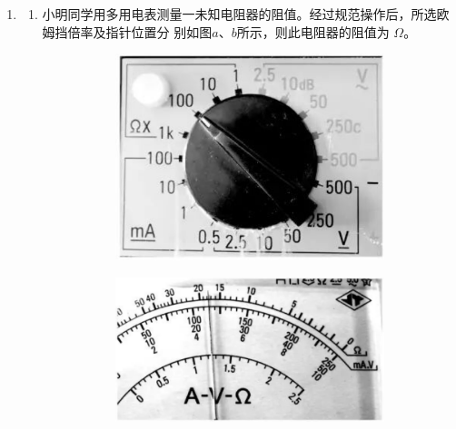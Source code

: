 \begin{enumerate}
\begin{enumerate}
\end{enumerate}




\item 
\begin{enumerate}
\item
小明同学用多用电表测量一未知电阻器的阻值。经过规范操作后，所选欧姆挡倍率及指针位置分
别如图$ a $、$ b $所示，则此电阻器的阻值为 \underlinegap $ \Omega $。
\begin{figure}[h!]
\centering
\begin{subfigure}{0.4\linewidth}
\centering
\includegraphics[width=0.7\linewidth]{picture/screenshot090}
\caption{}\label{}
\end{subfigure}
\begin{subfigure}{0.4\linewidth}
\centering
\includegraphics[width=0.8\linewidth]{picture/screenshot091}

\end{subfigure}
\end{figure}
\end{enumerate}
\end{enumerate}
